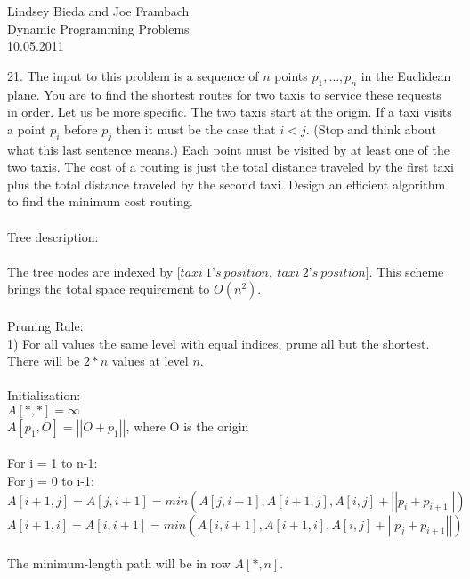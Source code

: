 \documentclass[10pt]{article}
\newcommand{\tab}{\hspace*{2em}}
\newcommand{\tabb}{\hspace*{4em}}
\newcommand{\norm}[1]{\left|\left|#1\right|\right|}
\begin{document}
	\begin{flushright}
	Lindsey Bieda and Joe Frambach\\
	Dynamic Programming Problems\\
	10.05.2011
	\end{flushright}
	21.	The input to this problem is a sequence of $n$ points $p_1, \ldots, p_n$ in the Euclidean plane. You are to find
		the shortest routes for two taxis to service these requests in order. Let us be more specific. The two
		taxis start at the origin. If a taxi visits a point $p_i$ before $p_j$ then it must be the case that $i < j$. (Stop
		and think about what this last sentence means.) Each point must be visited by at least one of the two
		taxis. The cost of a routing is just the total distance traveled by the first taxi plus the total distance
		traveled by the second taxi. Design an efficient algorithm to find the minimum cost routing.\\
		\\
		Tree description:\\
		\\
		The tree nodes are indexed by $[taxi~1$'$s~position,~taxi~2$'$s~position]$. This scheme brings the total
		space requirement to $O(n^2)$.\\
		\\
		Pruning Rule:\\
		1) For all values the same level with equal indices, prune all but the shortest. There will be $2*n$
		values at level $n$.\\
		\\
		Initialization: \\
		$A[*,*] = \infty$\\
		$A[p_1,O] = \norm{O+p_1}$, where O is the origin\\
		\\
		For i = 1 to n-1:\\
		\tab For j = 0 to i-1:\\
		\tabb $A[i+1,j] = A[j,i+1] = min( A[j,i+1], A[i+1,j], A[i,j] + \norm{p_i + p_{i+1}} )$\\
		\tabb $A[i+1,i] = A[i,i+1] = min( A[i,i+1], A[i+1,i], A[i,j] + \norm{p_j + p_{i+1}} )$\\
		\\
		The minimum-length path will be in row $A[*,n]$.
		
\end{document}
